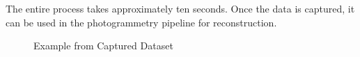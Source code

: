 \documentclass[12pt]{report}
\begin{document}
  The entire process takes approximately ten seconds. Once the data is captured, it can be used in the photogrammetry pipeline for reconstruction.
  \enlargethispage{\baselineskip}
  \begin{figure}[H]
    \centering
    \qquad
    \qquad
    \qquad
    \qquad
    \caption{Example from Captured Dataset}
    \label{fig:examples}
  \end{figure}
  
\end{document}
